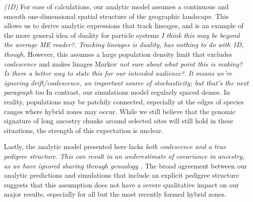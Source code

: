 \documentclass[11pt,letterpaper]{article}
\newcommand{\alisa}[1]{{\em \color{red} #1}}
\newcommand{\plr}[1]{{\em \color{blue} #1}}
\newcommand{\yb}[1]{{\em \color{magenta} #1}}
\begin{document}
\plr{(1D)}
For ease of calculations, our analytic model assumes a continuous and smooth one-dimensional spatial structure of the geographic landscape. This allows us to derive analytic expressions that track lineages, and is an example of the more general idea of duality for particle systems \alisa{I think this may be beyond the average ME reader?}. 
\plr{Tracking lineages is duality, has nothing to do with 1D, though.}
However, this assumes a large population density limit that excludes \plr{coalescence} and makes linages Markov \alisa{not sure about what point this is making? Is there a better way to state this for our intended audience?}.  
\plr{It means we're ignoring drift/coalescence, an important source of stochasticity; but that's the next paragraph too}
In contrast, our simulations model regularly spaced demes. In reality, populations may be patchily connected, especially at the edges of species ranges where hybrid zones may occur. While we still believe that the genomic signature of long ancestry chunks around selected sites will still hold in these situations, the strength of this expectation is unclear.

Lastly, the analytic model presented here lacks \yb{both coalescence and a true pedigree structure}. \alisa{This can result in an underestimate of covariance in ancestry, as we have ignored sharing through genealogy \cite{Liang2014}.} 
The broad agreement between our analytic predictions and simulations that include an explicit pedigree structure suggests that this assumption does not have a severe qualitative impact on our major results, especially for all but the most recently formed hybrid zones.



\end{document}
